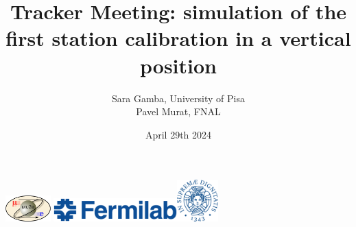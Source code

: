 \documentclass{beamer}[10pt]
\title[VST]{
  {
    {Tracker Meeting: simulation of the first station calibration in a vertical position} }
}
\author[Sara Gamba]{
  \fontseries{s}
  \selectfont
  { Sara Gamba, University of Pisa \\ Pavel Murat, FNAL}
}
\date{April 29th 2024}
\begin{document}
% 
% 



\begin{frame}
\centering
\includegraphics[height=1cm]{figures/png/mu2e_logo_oval.png}
\titlepage
\centering
\includegraphics[height=0.9cm]{figures/png/FNAL-Logo-NAL-Blue.png}\hspace{10mm}\includegraphics[height=1.6cm]{figures/pdf/cherubino.pdf}

\end{frame}
\end{document}
